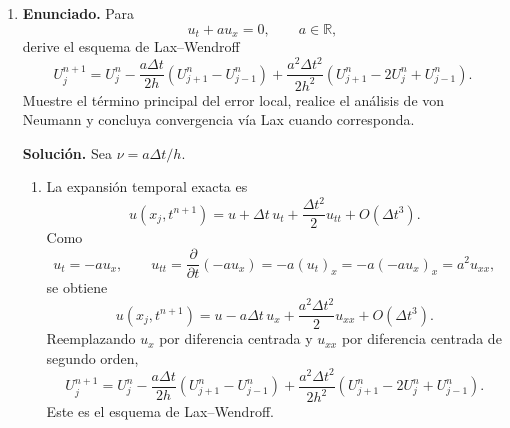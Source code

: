 \documentclass[11pt]{article}
\newcommand{\pd}[2]{\frac{\partial #1}{\partial #2}}
\newcommand{\abs}[1]{\left|#1\right|}
\def\R{\mathbb R}
\begin{document}
\begin{enumerate}[label=\textbf{\arabic*.}, leftmargin=*]
\begin{enumerate}[label=(\alph*)]
        \item Para von Neumann, usamos el modo
        \[
            U_j^n=g^n e^{i j\theta},
            \qquad \theta=\xi h.
        \]
        Sustituyendo en el esquema,
        \begin{align*}
            \frac{g-1}{\Delta t}
            +
            \frac{e^{i\theta}-e^{-i\theta}}{2h}
            &=0,\\
            g(\theta)
            &=1-i\lambda\sin\theta.
        \end{align*}

        \item Entonces
        \[
            \abs{g(\theta)}^2
            =
            1+\lambda^2\sin^2\theta.
        \]
        Si $\lambda>0$, existe $\theta$ tal que $\sin\theta\neq0$, y para ese modo
        \[
            \abs{g(\theta)}>1.
        \]
        Por tanto, el esquema es inestable para todo $\lambda>0$. Este ejemplo muestra que la consistencia no basta: aunque el residuo local tiende a cero, algunos modos de Fourier se amplifican artificialmente. Sin estabilidad no se puede concluir convergencia.
    \end{enumerate}

    \item \textbf{Enunciado.} Para
    \[
        u_t+a u_x=0,\qquad a\in\R,
    \]
    derive el esquema de Lax--Wendroff
    \[
        U_j^{n+1}
        =
        U_j^n
        -\frac{a\Delta t}{2h}(U_{j+1}^n-U_{j-1}^n)
        +\frac{a^2\Delta t^2}{2h^2}(U_{j+1}^n-2U_j^n+U_{j-1}^n).
    \]
    Muestre el término principal del error local, realice el análisis de von Neumann y concluya convergencia vía Lax cuando corresponda.

    \textbf{Solución.} Sea $\nu=a\Delta t/h$.
    \begin{enumerate}[label=(\alph*)]
        \item La expansión temporal exacta es
        \[
            u(x_j,t^{n+1})
            =
            u+\Delta t\,u_t+\frac{\Delta t^2}{2}u_{tt}+O(\Delta t^3).
        \]
        Como
        \[
            u_t=-a u_x,
            \qquad
            u_{tt}=\pd{}{t}(-a u_x)=-a(u_t)_x=-a(-a u_x)_x=a^2u_{xx},
        \]
        se obtiene
        \[
            u(x_j,t^{n+1})
            =
            u-a\Delta t\,u_x+\frac{a^2\Delta t^2}{2}u_{xx}+O(\Delta t^3).
        \]
        Reemplazando $u_x$ por diferencia centrada y $u_{xx}$ por diferencia centrada de segundo orden,
        \[
            U_j^{n+1}
            =
            U_j^n
            -\frac{a\Delta t}{2h}(U_{j+1}^n-U_{j-1}^n)
            +\frac{a^2\Delta t^2}{2h^2}(U_{j+1}^n-2U_j^n+U_{j-1}^n).
        \]
        Este es el esquema de Lax--Wendroff.


\end{enumerate}
\end{enumerate}
\end{document}

